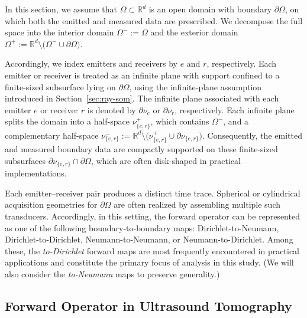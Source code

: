 \documentclass[11pt,reqno]{amsart}
\theoremstyle{remark}
\theoremstyle{italic_lemma}
\begin{document}
In this section, we assume that \( \Omega \subset \mathbb{R}^d \) is an open domain with boundary \( \partial \Omega \), on which both the emitted and measured data are prescribed. We decompose the full space into the interior domain \( \Omega^- := \Omega \) and the exterior domain \( \Omega^+ := \mathbb{R}^d \setminus \big( \Omega^- \cup \partial \Omega \big) \).





Accordingly, we index emitters and receivers by \( e \) and \( r \), respectively. Each emitter or receiver is treated as an infinite plane with support confined to a finite-sized subsurface lying on \( \partial \Omega \), using the infinite-plane assumption introduced in Section~\ref{sec:ray-som}. The infinite plane associated with each emitter \( e \) or receiver \( r \) is denoted by \( \partial \nu_e \) or \( \partial \nu_r \), respectively. Each infinite plane splits the domain into a half-space \( \nu_{\{e,r\}}^+ \), which contains \( \Omega^- \), and a complementary half-space \( \nu_{\{e,r\}}^- := \mathbb{R}^d \setminus \big( \nu_{\{e,r\}}^+ \cup \partial \nu_{\{e,r\}} \big) \). Consequently, the emitted and measured boundary data are compactly supported on these finite-sized subsurfaces \( \partial \nu_{\{e,r\}} \cap \partial \Omega \), which are often disk-shaped in practical implementations.

Each emitter--receiver pair produces a distinct time trace. Spherical or cylindrical acquisition geometries for \( \partial \Omega \) are often realized by assembling multiple such transducers. Accordingly, in this setting, the forward operator can be represented as one of the following boundary-to-boundary maps: Dirichlet-to-Neumann, Dirichlet-to-Dirichlet, Neumann-to-Neumann, or Neumann-to-Dirichlet. Among these, the \emph{to-Dirichlet} forward maps are most frequently encountered in practical applications and constitute the primary focus of analysis in this study. (We will also consider the \emph{to-Neumann} maps to preserve generality.)



\subsection{Forward Operator in Ultrasound Tomography}
\end{document}
